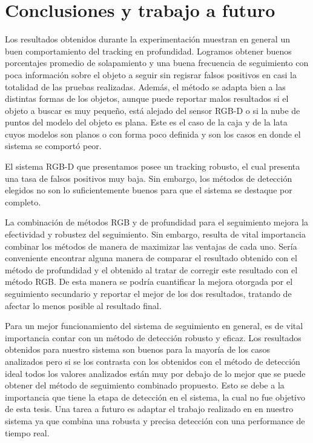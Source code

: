 \chapter{Conclusiones y trabajo a futuro}\label{chap:conclusiones}
Los resultados obtenidos durante la experimentación muestran en general un buen comportamiento del tracking en profundidad. Logramos obtener buenos porcentajes promedio de solapamiento y una buena frecuencia de seguimiento con poca información sobre el objeto a seguir sin regisrar falsos positivos en casi la totalidad de las pruebas realizadas. Además, el método se adapta bien a las distintas formas de los objetos, aunque puede reportar malos resultados si el objeto a buscar es muy pequeño, está alejado del sensor RGB-D o si la nube de puntos del modelo del objeto es plana. Este es el caso de la caja y de la lata cuyos modelos son planos o con forma poco definida y son los casos en donde el sistema se comportó peor.

El sistema RGB-D que presentamos posee un tracking robusto, el cual presenta una tasa de falsos positivos muy baja. Sin embargo, los métodos de detección elegidos no son lo suficientemente buenos para que el sistema se destaque por completo.

La combinación de métodos RGB y de profundidad para el seguimiento mejora la efectividad y robustez del seguimiento. Sin embargo, resulta de vital importancia combinar los métodos de manera de maximizar las ventajas de cada uno. Sería conveniente encontrar alguna manera de comparar el resultado obtenido con el método de profundidad y el obtenido al tratar de corregir este resultado con el método RGB. De esta manera se podría cuantificar la mejora otorgada por el seguimiento secundario y reportar el mejor de los dos resultados, tratando de afectar lo menos posible al resultado final.

Para un mejor funcionamiento del sistema de seguimiento en general, es de vital importancia contar con un método de detección robusto y eficaz. Los resultados obtenidos para nuestro sistema son buenos para la mayoría de los casos analizados pero si se los contrasta con los obtenidos con el método de detección ideal todos los valores analizados están muy por debajo de lo mejor que se puede obtener del método de seguimiento combinado propuesto. Esto se debe a la importancia que tiene la etapa de detección en el sistema, la cual no fue objetivo de esta tesis. Una tarea a futuro es adaptar el trabajo realizado en \cite{hinterstoisser2010dominant} en nuestro sistema ya que combina una robusta y precisa detección con una performance de tiempo real.

